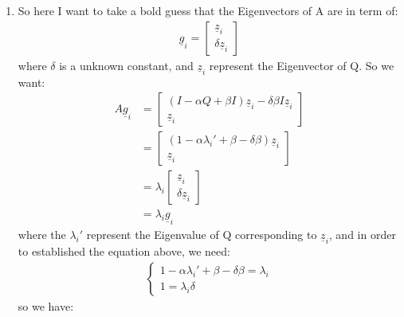 \documentclass[11pt,letterpaper]{article}
\begin{document}
\begin{tcolorbox}
    \begin{enumerate}[\quad\quad]
        \item So here I want to take a bold guess that the Eigenvectors of A are in term of:
        \begin{align*}
            \underline g_i = \begin{bmatrix}
                 \underline z_i \\
                \delta \underline z_i
            \end{bmatrix}
        \end{align*}
        where $\delta$ is a unknown constant, and $\underline z_i$ represent the Eigenvector of Q. So we want:
        \begin{align*}
            A\underline g_i &= 
            \begin{bmatrix}
                (I - \alpha Q + \beta I)\underline z_i - \delta \beta I \underline z_i \\
                \underline z_i
            \end{bmatrix} \\
            &= \begin{bmatrix}
                (1 - \alpha \lambda_i' + \beta - \delta \beta) \underline z_i \\
                \underline z_i
            \end{bmatrix} \\
            &= \lambda_i 
            \begin{bmatrix}
                \underline z_i \\
                \delta \underline z_i
            \end{bmatrix} \\
            &= \lambda_i \underline g_i
        \end{align*}
        where the $\lambda_i'$ represent the Eigenvalue of Q corresponding to $\underline z_i$, and in order to established the equation above, we need:
        \begin{align*}
            \begin{cases}
                1 - \alpha \lambda_i' + \beta - \delta \beta = \lambda_i
                \\
                1= \lambda_i \delta
            \end{cases}
        \end{align*}
        so we have:
        \begin{align*}

\end{align*}
\end{enumerate}
\end{tcolorbox}
\end{document}
